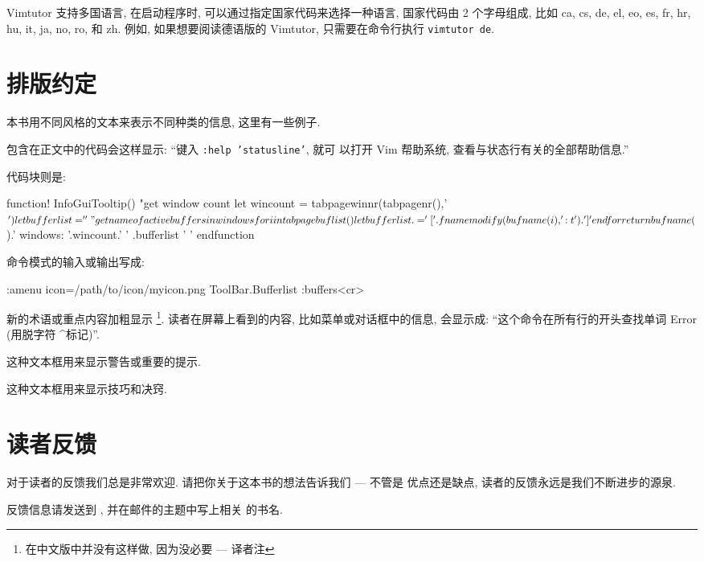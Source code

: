 Vimtutor 支持多国语言, 在启动程序时, 可以通过指定国家代码来选择一种语言,
国家代码由 2 个字母组成, 比如 ca, cs, de, el, eo, es, fr, hr, hu, it, ja,
no, ro, 和 zh. 例如, 如果想要阅读德语版的 Vimtutor, 只需要在命令行执行
\texttt{vimtutor de}.

\section*{排版约定}
\label{sec:conventions}
本书用不同风格的文本来表示不同种类的信息, 这里有一些例子.

包含在正文中的代码会这样显示: ``键入 \texttt{:help 'statusline'}, 就可
以打开 Vim 帮助系统, 查看与状态行有关的全部帮助信息.''

代码块则是:
\begin{vimcode}
function! InfoGuiTooltip()
    "get window count
    let wincount = tabpagewinnr(tabpagenr(),'$')
    let bufferlist=''
    "get name of active buffers in windows
    for i in tabpagebuflist()
        let bufferlist .= '['.fnamemodify(bufname(i),':t').'] '
    endfor
    return bufname($).' windows: '.wincount.' ' .bufferlist ' '
endfunction
\end{vimcode}

命令模式的输入或输出写成:
\begin{vimcode}
:amenu icon=/path/to/icon/myicon.png ToolBar.Bufferlist :buffers<cr>
\end{vimcode}

新的术语或重点内容加粗显示 \footnote{在中文版中并没有这样做, 因为没必要 ---
译者注}. 读者在屏幕上看到的内容,
比如菜单或对话框中的信息, 会显示成: ``这个命令在所有行的开头查找单词
Error (用脱字符 \textasciicircum 标记)''.

\begin{warning}
这种文本框用来显示警告或重要的提示.
\end{warning}

\begin{tips}
这种文本框用来显示技巧和决窍.
\end{tips}

\section*{读者反馈}
\label{sec:reader_feedback}
对于读者的反馈我们总是非常欢迎. 请把你关于这本书的想法告诉我们 --- 不管是
优点还是缺点, 读者的反馈永远是我们不断进步的源泉.

反馈信息请发送到 , 并在邮件的主题中写上相关
的书名.

